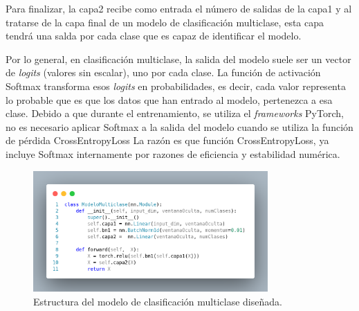 Para finalizar, la capa2 recibe como entrada el número de salidas de la capa1 y al tratarse de la capa final de un modelo de clasificación multiclase, esta capa tendrá una salda por cada clase que es capaz de identificar el modelo.

Por lo general, en clasificación multiclase, la salida del modelo suele ser un vector de \textit{logits} (valores sin escalar), uno por cada clase. La función de activación Softmax transforma esos \textit{logits} en probabilidades, es decir, cada valor representa lo probable que es que los datos que han entrado al modelo, pertenezca a esa clase. Debido a que durante el entrenamiento, se utiliza el \textit{frameworks} PyTorch, no es necesario aplicar Softmax a la salida del modelo cuando se utiliza la función de pérdida CrossEntropyLoss La razón es que función CrossEntropyLoss, ya incluye Softmax internamente por razones de eficiencia y estabilidad numérica.

\begin{figure}[H]
    \centering
    \includegraphics[width=0.8\textwidth]{./img/modelo/modeloMUL.png}
    \caption{Estructura del modelo de clasificación multiclase diseñada.}
    \label{fig:modMUL}
\end{figure}

